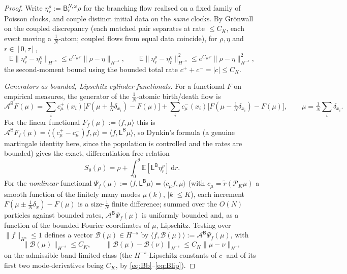 \documentclass[a4paper,fleqn]{cas-sc}
\theoremstyle{definition}
\theoremstyle{remark}
\begin{document}
\begin{proof}
Write $\eta^\rho_r:=\mathsf B^{N,\omega}_r\rho$ for the branching flow realised on a
fixed family of Poisson clocks, and couple distinct initial data on the \emph{same}
clocks. By Gr\"onwall on the coupled discrepancy (each matched pair separates at rate
$\le C_K$, each event moving a $\tfrac1N$-atom; coupled flows from equal data
coincide), for $\rho,\eta$ and $r\in[0,\tau]$,
\begin{equation}\label{eq:sens-coup}
\mathbb E\|\eta^\rho_r-\eta^\eta_r\|_{H^{-s}}\le e^{C_Kr}\|\rho-\eta\|_{H^{-s}},
\qquad
\mathbb E\|\eta^\rho_r-\eta^\eta_r\|_{H^{-s}}^2\le e^{C_Kr}\|\rho-\eta\|_{H^{-s}}^2,
\end{equation}
the second-moment bound using the bounded total rate $c^++c^-=|c|\le C_K$.

\emph{Generators as bounded, Lipschitz cylinder functionals.} For a functional $F$ on
empirical measures, the generator of the $\tfrac1N$-atomic birth/death flow is
\[
\mathcal A^{\mathsf B}F(\mu)
=\sum_{i}c^+_\mu(x_i)\bigl[F(\mu+\tfrac1N\delta_{x_i})-F(\mu)\bigr]
+\sum_{i}c^-_\mu(x_i)\bigl[F(\mu-\tfrac1N\delta_{x_i})-F(\mu)\bigr],
\qquad \mu=\tfrac1N\textstyle\sum_i\delta_{x_i}.
\]
For the linear functional $F_f(\mu):=\langle f,\mu\rangle$ this is
$\mathcal A^{\mathsf B}F_f(\mu)=\langle(c^+_\mu-c^-_\mu)f,\mu\rangle=\langle f,\mathsf L^{\mathsf B}\mu\rangle$,
so Dynkin's formula (a genuine martingale identity here, since the population is
controlled and the rates are bounded) gives the exact, differentiation-free relation
\begin{equation}\label{eq:sens-dynkin1}
S_\theta(\rho)=\rho+\int_0^\theta\mathbb E[\mathsf L^{\mathsf B}\eta^\rho_r]\,\mathrm dr.
\end{equation}
For the \emph{nonlinear} functional
$\Psi_f(\mu):=\langle f,\mathsf L^{\mathsf B}\mu\rangle=\langle c_\mu f,\mu\rangle$
(with $c_\mu=\tilde r(\mathcal P_K\mu)$ a smooth function of the finitely many modes
$\hat\mu(k)$, $|k|\le K$), each increment $F(\mu\pm\tfrac1N\delta_x)-F(\mu)$ is a
size-$\tfrac1N$ finite difference; summed over the $O(N)$ particles against bounded
rates, $\mathcal A^{\mathsf B}\Psi_f(\mu)$ is uniformly bounded and, as a function of
the bounded Fourier coordinates of $\mu$, Lipschitz. Testing over $\|f\|_{H^s}\le1$
defines a vector $\mathcal B(\mu)\in H^{-s}$ by
$\langle f,\mathcal B(\mu)\rangle:=\mathcal A^{\mathsf B}\Psi_f(\mu)$, with
\begin{equation}\label{eq:sens-gen2}
\|\mathcal B(\mu)\|_{H^{-s}}\le C_K,
\qquad
\|\mathcal B(\mu)-\mathcal B(\nu)\|_{H^{-s}}\le C_K\|\mu-\nu\|_{H^{-s}}
\end{equation}
on the admissible band-limited class (the $H^{-s}$-Lipschitz constants of $c_\cdot$ and
of its first two mode-derivatives being $C_K$, by \eqref{eq:Bb}--\eqref{eq:Blip}).


\end{proof}
\end{document}
